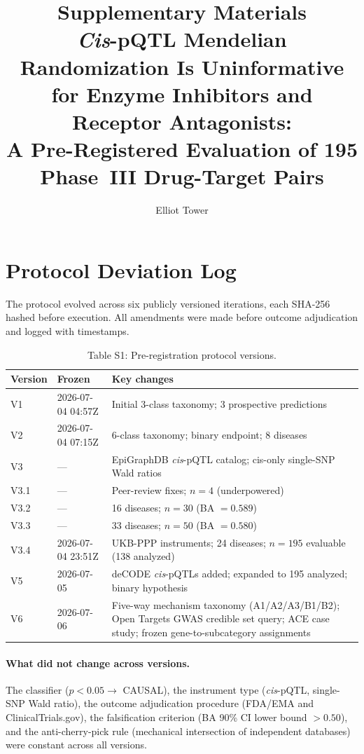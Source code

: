 \documentclass[11pt]{article}
\title{Supplementary Materials\\[0.5em]
\large \emph{Cis}-pQTL Mendelian Randomization Is Uninformative for Enzyme Inhibitors and Receptor Antagonists:\\A Pre-Registered Evaluation of 195 Phase~III Drug-Target Pairs}
\author{Elliot Tower}
\date{}
\begin{document}
\maketitle

\tableofcontents
\clearpage

\section{Protocol Deviation Log}
\label{supp:deviation}

The protocol evolved across six publicly versioned iterations, each SHA-256 hashed before execution. All amendments were made before outcome adjudication and logged with timestamps.

\vspace{1em}
\begin{table}[H]
\centering
\caption{Table S1: Pre-registration protocol versions.}
\label{tab:versions}
\small
\begin{tabular}{llp{6.5cm}}
\toprule
Version & Frozen & Key changes \\
\midrule
V1 & 2026-07-04 04:57Z & Initial 3-class taxonomy; 3 prospective predictions \\
V2 & 2026-07-04 07:15Z & 6-class taxonomy; binary endpoint; 8 diseases \\
V3 & --- & EpiGraphDB \emph{cis}-pQTL catalog; cis-only single-SNP Wald ratios \\
V3.1 & --- & Peer-review fixes; $n = 4$ (underpowered) \\
V3.2 & --- & 16 diseases; $n = 30$ (BA $= 0.589$) \\
V3.3 & --- & 33 diseases; $n = 50$ (BA $= 0.580$) \\
V3.4 & 2026-07-04 23:51Z & UKB-PPP instruments; 24 diseases; $n = 195$ evaluable (138 analyzed) \\
V5 & 2026-07-05 & deCODE \emph{cis}-pQTLs added; expanded to 195 analyzed; binary hypothesis \\
V6 & 2026-07-06 & Five-way mechanism taxonomy (A1/A2/A3/B1/B2); Open Targets GWAS credible set query; ACE case study; frozen gene-to-subcategory assignments \\
\bottomrule
\end{tabular}
\end{table}

\paragraph{What did not change across versions.}
The classifier ($p < 0.05 \rightarrow$ CAUSAL), the instrument type (\emph{cis}-pQTL, single-SNP Wald ratio), the outcome adjudication procedure (FDA/EMA and ClinicalTrials.gov), the falsification criterion (BA 90\% CI lower bound $> 0.50$), and the anti-cherry-pick rule (mechanical intersection of independent databases) were constant across all versions.
\end{document}

